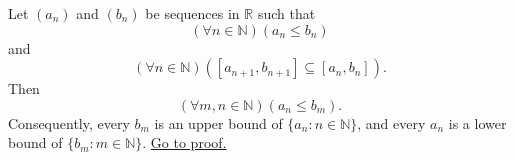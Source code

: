 \begin{lemma}
\label{lem:left-endpoints-bounded-above-by-right-endpoints}
Let $(a_n)$ and $(b_n)$ be sequences in $\mathbb{R}$ such that
\[
  (\forall n\in\mathbb{N})(a_n\leq b_n)
\]
and
\[
  (\forall n\in\mathbb{N})([a_{n+1},b_{n+1}]\subseteq [a_n,b_n]).
\]
Then
\[
  (\forall m,n\in\mathbb{N})(a_n\leq b_m).
\]
Consequently, every $b_m$ is an upper bound of $\{a_n:n\in\mathbb{N}\}$, and
every $a_n$ is a lower bound of $\{b_m:m\in\mathbb{N}\}$.
\hyperref[prf:left-endpoints-bounded-above-by-right-endpoints]{Go to proof.}
\end{lemma}